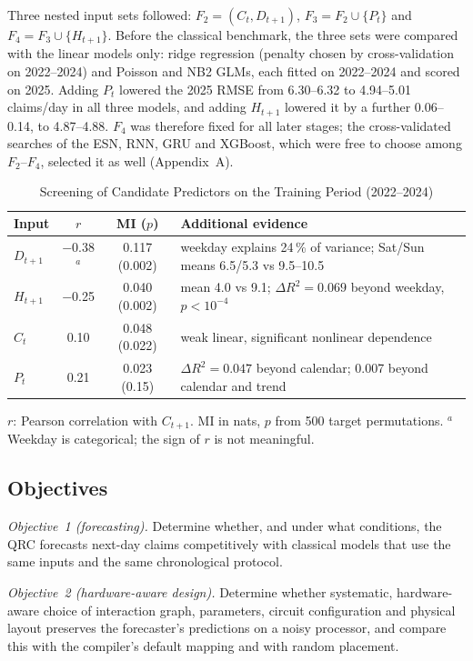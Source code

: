 \documentclass[journal]{IEEEtran}
\begin{document}
Three nested input sets followed: $F_2=(C_t,D_{t+1})$, $F_3=F_2\cup\{P_t\}$ and $F_4=F_3\cup\{H_{t+1}\}$. Before the classical benchmark, the three sets were compared with the linear models only: ridge regression (penalty chosen by cross-validation on 2022--2024) and Poisson and NB2 GLMs, each fitted on 2022--2024 and scored on 2025. Adding $P_t$ lowered the 2025 RMSE from 6.30--6.32 to 4.94--5.01 claims/day in all three models, and adding $H_{t+1}$ lowered it by a further 0.06--0.14, to 4.87--4.88. $F_4$ was therefore fixed for all later stages; the cross-validated searches of the ESN, RNN, GRU and XGBoost, which were free to choose among $F_2$--$F_4$, selected it as well (Appendix~A).

\begin{table}[t]
\centering
\caption{Screening of Candidate Predictors on the Training Period (2022--2024)}
\label{tab:predictors}
\footnotesize
\setlength{\tabcolsep}{2.5pt}
\begin{tabular}{@{}lccp{4.15cm}@{}}
\toprule
Input & $r$ & MI ($p$) & Additional evidence \\
\midrule
$D_{t+1}$ & $-$0.38$^{a}$ & 0.117 (0.002) & weekday explains 24\,\% of variance; Sat/Sun means 6.5/5.3 vs 9.5--10.5 \\
$H_{t+1}$ & $-$0.25 & 0.040 (0.002) & mean 4.0 vs 9.1; $\Delta R^2=0.069$ beyond weekday, $p<10^{-4}$ \\
$C_t$ & 0.10 & 0.048 (0.022) & weak linear, significant nonlinear dependence \\
$P_t$ & 0.21 & 0.023 (0.15) & $\Delta R^2=0.047$ beyond calendar; 0.007 beyond calendar and trend \\
\bottomrule
\end{tabular}

\smallskip
\parbox{\columnwidth}{\scriptsize $r$: Pearson correlation with $C_{t+1}$. MI in nats, $p$ from 500 target permutations. $^{a}$Weekday is categorical; the sign of $r$ is not meaningful.}
\end{table}

\subsection{Objectives}
\emph{Objective~1 (forecasting).} Determine whether, and under what conditions, the QRC forecasts next-day claims competitively with classical models that use the same inputs and the same chronological protocol.

\emph{Objective~2 (hardware-aware design).} Determine whether systematic, hardware-aware choice of interaction graph, parameters, circuit configuration and physical layout preserves the forecaster's predictions on a noisy processor, and compare this with the compiler's default mapping and with random placement.
\end{document}
